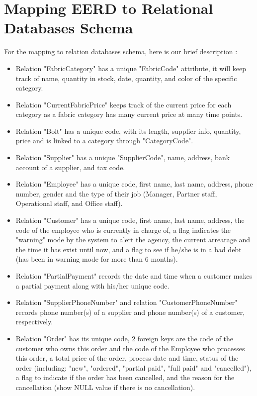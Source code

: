 \documentclass[a4paper]{article}
\begin{document}
\newpage
\section{Mapping EERD to Relational Databases Schema}
For the mapping to relation databases schema, here is our brief description :
\begin{itemize}
    \item Relation "FabricCategory" has a unique "FabricCode" attribute, it will keep track of name, quantity in stock, date, quantity, and color of the specific category.
    \item Relation "CurrentFabricPrice" keeps track of the current price for each category as a fabric category has many current price at many time points.
    \item Relation "Bolt" has a unique code, with its length, supplier info, quantity, price and is linked to a category through "CategoryCode".
    \item Relation "Supplier" has a unique "SupplierCode", name, address, bank account of a supplier, and tax code.
    \item Relation "Employee" has a unique code, first name, last name, address, phone number, gender and the type of their job (Manager, Partner staff, Operational staff, and Office staff).
    \item Relation "Customer" has a unique code, first name, last name, address, the code of the employee who is currently in charge of, a flag indicates the "warning" mode by the system to alert the agency, the current arrearage and the time it has exist until now, and a flag to see if he/she is in a bad debt (has been in warning mode for more than 6 months). 
    \item Relation "PartialPayment" records the date and time when a customer makes a partial payment along with his/her unique code.
    \item Relation "SupplierPhoneNumber" and relation "CustomerPhoneNumber" records phone number(s) of a supplier and phone number(s) of a customer, respectively.
    \item Relation "Order" has its unique code, 2 foreign keys are the code of the customer who owns this order and the code of the Employee who processes this order, a total price of the order, process date and time, status of the order (including: "new", "ordered", "partial paid", "full paid" and "cancelled"), a flag to indicate if the order has been cancelled, and the reason for the cancellation (show NULL value if there is no cancellation).
\end{itemize}
\end{document}
